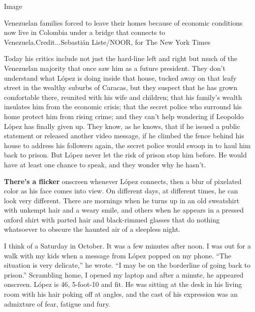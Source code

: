 Image

Venezuelan families forced to leave their homes because of economic
conditions now live in Colombia under a bridge that connects to
Venezuela.Credit...Sebastián Liste/NOOR, for The New York Times

Today his critics include not just the hard-line left and right but much
of the Venezuelan majority that once saw him as a future president. They
don't understand what López is doing inside that house, tucked away on
that leafy street in the wealthy suburbs of Caracas, but they suspect
that he has grown comfortable there, reunited with his wife and
children; that his family's wealth insulates him from the economic
crisis; that the secret police who surround his home protect him from
rising crime; and they can't help wondering if Leopoldo López has
finally given up. They know, as he knows, that if he issued a public
statement or released another video message, if he climbed the fence
behind his house to address his followers again, the secret police would
swoop in to haul him back to prison. But López never let the risk of
prison stop him before. He would have at least one chance to speak, and
they wonder why he hasn't.

\textbf{There's a flicker} onscreen whenever López connects, then a blur
of pixelated color as his face comes into view. On different days, at
different times, he can look very different. There are mornings when he
turns up in an old sweatshirt with unkempt hair and a weary smile, and
others when he appears in a pressed oxford shirt with parted hair and
black-rimmed glasses that do nothing whatsoever to obscure the haunted
air of a sleepless night.

I think of a Saturday in October. It was a few minutes after noon. I was
out for a walk with my kids when a message from López popped on my
phone. ``The situation is very delicate,'' he wrote. ``I may be on the
borderline of going back to prison.'' Scrambling home, I opened my
laptop and after a minute, he appeared onscreen. López is 46, 5-foot-10
and fit. He was sitting at the desk in his living room with his hair
poking off at angles, and the cast of his expression was an admixture of
fear, fatigue and fury.

